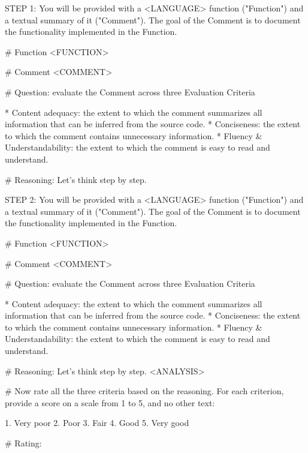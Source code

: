 STEP 1:
You will be provided with a <LANGUAGE> function ("Function") and a textual summary of it ("Comment"). The goal of the Comment is to document the functionality implemented in the Function.

# Function
<FUNCTION>

# Comment
<COMMENT>

# Question: evaluate the Comment across three Evaluation Criteria

* Content adequacy: the extent to which the comment summarizes all information that can be inferred from the source code.
* Conciseness: the extent to which the comment contains unnecessary information.
* Fluency & Understandability: the extent to which the comment is easy to read and understand.

# Reasoning: Let's think step by step.

STEP 2:
You will be provided with a <LANGUAGE> function ("Function") and a textual summary of it ("Comment"). The goal of the Comment is to document the functionality implemented in the Function.

# Function
<FUNCTION>

# Comment
<COMMENT>

# Question: evaluate the Comment across three Evaluation Criteria

* Content adequacy: the extent to which the comment summarizes all information that can be inferred from the source code.
* Conciseness: the extent to which the comment contains unnecessary information.
* Fluency & Understandability: the extent to which the comment is easy to read and understand.

# Reasoning: Let's think step by step.
<ANALYSIS>

# Now rate all the three criteria based on the reasoning. For each criterion, provide a score on a scale from 1 to 5, and no other text:

1. Very poor
2. Poor
3. Fair
4. Good
5. Very good

# Rating: